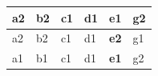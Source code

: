 \documentclass[10pt,a4paper,answers]{exam}
\newcounter{sol}
\begin{document}
\begin{questions}
\begin{solution}
\begin{enumerate}
\begin{center}
\begin{tabular}{|l|l|l|l|l|l|}
				a2                                                       & b2                                                      & c1                                                      & d1                                                      & \textbf{e1}                                                      & g2                                                                             \\ \hline
				a2                                                       & b2                                                      & c1                                                      & d1                                                      & \textbf{e2}                                                      & g1                                                                             \\ \hline
				a1                                                       & b1                                                      & c1                                                      & d1                                                      & \textbf{e1}                                                      & g2                                                                             \\ \hline
			\end{tabular}
		\end{center}
		

\end{enumerate}
\end{solution}
\end{questions}
\end{document}
